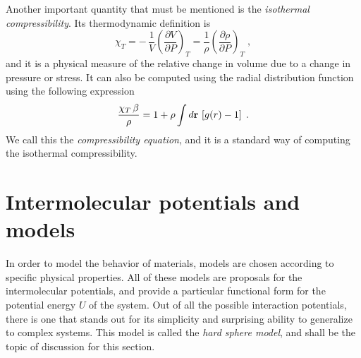 Another important quantity that must be mentioned is the
\emph{isothermal compressibility}. Its thermodynamic definition is
\begin{equation}
    \chi_{T} = - \, \frac{1}{V} { \left( \frac{\partial V}{\partial P} \right) }_{T} =
    \frac{1}{\rho} { \left( \frac{\partial \rho}{\partial P} \right) }_{T}
    \; ,
    \label{eq:isothermal-chi}
\end{equation}
and it is a physical measure of the relative change in volume due to a change
in pressure or stress.
It can also be computed using the radial distribution function using the following
expression~\cite{hansenTheorySimpleLiquids2013}
\begin{equation}
    \frac{\chi_{T} \, \beta}{\rho} = 1 + \rho \int d \mathbf{r} \, \left[ g(r) - 1 \right]
    \; .
    \label{eq:chi-rdf}
\end{equation}
We call this the \emph{compressibility equation}, and it is a standard way of computing
the isothermal compressibility.

\section{Intermolecular potentials and models}

In order to model the behavior of materials, models are chosen according to specific
physical properties. All of these models are proposals for the intermolecular potentials,
and provide a particular functional form for the potential energy $U$ of the system.
Out of all the possible interaction potentials, there is one that stands out for its
simplicity and surprising ability to generalize to complex systems. This model is
called the \emph{hard sphere model}, and shall be the topic of discussion for this
section.

